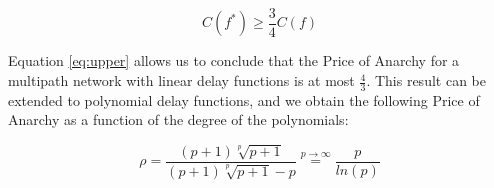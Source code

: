 \begin{equation}
  C(f^{*}) \geq \frac{3}{4} C(f)
  \label{eq:upper}
\end{equation}

Equation \ref{eq:upper} allows us to conclude that the Price of Anarchy for a multipath network with linear delay functions is at most $\frac{4}{3}$. This result can be extended to polynomial delay functions, and we obtain the following Price of Anarchy as a function of the degree of the polynomials:

\begin{equation}
 \rho = \frac{(p+1)\sqrt[p]{p+1}}{(p+1)\sqrt[p]{p+1}-p} \stackrel{p \rightarrow \infty}{=} \frac{p}{ln(p)}
\end{equation}



